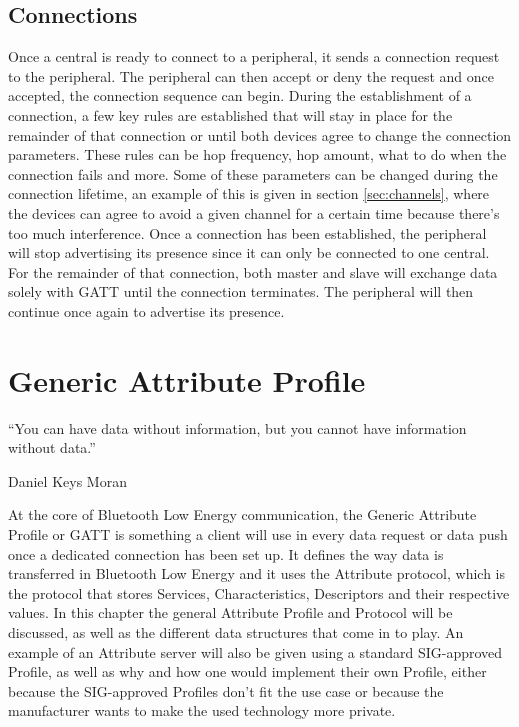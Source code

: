 \documentclass[pdftex,a4paper,12pt,twoside]{report}
\begin{document}
\section{Connections}
\label{sec:connections}
Once a central is ready to connect to a peripheral, it sends a connection request to the peripheral. The peripheral can then accept or deny the request and once accepted, the connection sequence can begin. During the establishment of a connection, a few key rules are established that will stay in place for the remainder of that connection or until both devices agree to change the connection parameters. These rules can be hop frequency, hop amount, what to do when the connection fails and more. Some of these parameters can be changed during the connection lifetime, an example of this is given in section \ref{sec:channels}, where the devices can agree to avoid a given channel for a certain time because there's too much interference. Once a connection has been established, the peripheral will stop advertising its presence since it can only be connected to one central. For the remainder of that connection, both master and slave will exchange data solely with GATT until the connection terminates. The peripheral will then continue once again to advertise its presence.

\chapter{Generic Attribute Profile}
\label{ch:gatt}
\epigraph{``You can have data without information, but you cannot have information without data.''}{Daniel Keys Moran}
At the core of Bluetooth Low Energy communication, the Generic Attribute Profile or GATT is something a client will use in every data request or data push once a dedicated connection has been set up. It defines the way data is transferred in Bluetooth Low Energy and it uses the Attribute protocol, which is the protocol that stores Services, Characteristics, Descriptors and their respective values. In this chapter the general Attribute Profile and Protocol will be discussed, as well as the different data structures that come in to play. An example of an Attribute server will also be given using a standard SIG-approved Profile, as well as why and how one would implement their own Profile, either because the SIG-approved Profiles don't fit the use case or because the manufacturer wants to make the used technology more private.

\newpage{}
\end{document}
